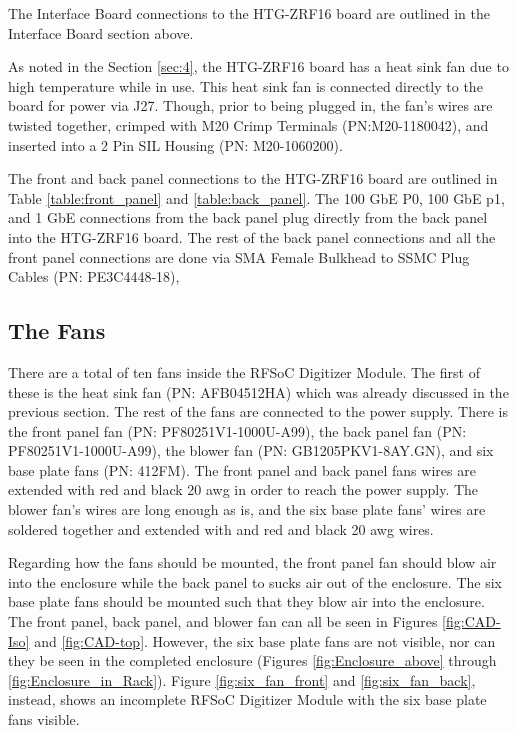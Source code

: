 \documentclass[12pt,a4paper,oneside]{article}
\begin{document}
The Interface Board connections to the HTG-ZRF16 board are outlined in the Interface Board section above. 

As noted in the Section \ref{sec:4}, the HTG-ZRF16 board has a heat sink fan due to high temperature while in use. This heat sink fan is connected directly to the board for power via J27. Though, prior to being plugged in, the fan's wires are twisted together, crimped with M20 Crimp Terminals (PN:M20-1180042), and inserted into a 2 Pin SIL Housing (PN: M20-1060200). 

The front and back panel connections to the HTG-ZRF16 board are outlined in Table \ref{table:front_panel} and \ref{table:back_panel}. The 100 GbE P0, 100 GbE p1, and 1 GbE connections from the back panel plug directly from the back panel into the HTG-ZRF16 board. The rest of the back panel connections and all the front panel connections are done via SMA Female Bulkhead to SSMC Plug Cables (PN: PE3C4448-18),


\subsection{The Fans}
\label{sec: the 6.4}

There are a total of ten fans inside the RFSoC Digitizer Module. The first of these is the heat sink fan (PN: AFB04512HA) which was already discussed in the previous section. The rest of the fans are connected to the power supply. There is the front panel fan (PN: PF80251V1-1000U-A99), the back panel fan (PN: PF80251V1-1000U-A99), the blower fan (PN: GB1205PKV1-8AY.GN), and six base plate fans (PN: 412FM). The front panel and back panel fans wires are extended with red and black 20 awg in order to reach the power supply. The blower fan's wires are long enough as is, and the six base plate fans' wires are soldered together and extended with and red and black 20 awg wires. 

Regarding how the fans should be mounted, the front panel fan should blow air into the enclosure while the back panel to sucks air out of the enclosure. The six base plate fans should be mounted such that they blow air into the enclosure. The front panel, back panel, and blower fan can all be seen in Figures \ref{fig:CAD-Iso} and \ref{fig:CAD-top}. However, the six base plate fans are not visible, nor can they be seen in the completed enclosure (Figures \ref{fig:Enclosure_above} through \ref{fig:Enclosure_in_Rack}). Figure \ref{fig:six_fan_front} and \ref{fig:six_fan_back}, instead, shows an incomplete RFSoC Digitizer Module with the six base plate fans visible.
\end{document}
